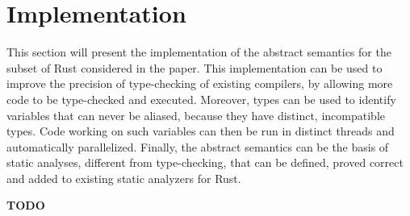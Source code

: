 \section{Implementation}\label{sec:implementation}

This section will present the implementation of the abstract semantics
for the subset of Rust considered in the paper. This implementation can be
used to improve the precision of type-checking of existing compilers,
by allowing more code to be type-checked and executed. Moreover,
types can be used to identify variables that can never be aliased, because
they have distinct, incompatible types. Code working on such variables can
then be run in distinct threads and automatically parallelized.
Finally, the abstract semantics can be the basis of static analyses,
different from type-checking, that can be defined, proved correct and
added to existing static analyzers for Rust.

\textbf{TODO}
